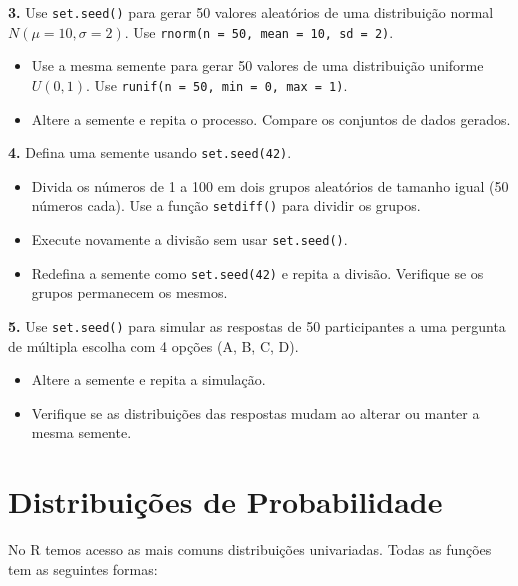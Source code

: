 \documentclass[
]{book}
\providecommand{\tightlist}{%
  \setlength{\itemsep}{0pt}\setlength{\parskip}{0pt}}
\begin{document}
\textbf{3.} Use \texttt{set.seed()} para gerar 50 valores aleatórios de uma distribuição normal \(N(\mu=10, \sigma=2)\). Use \texttt{rnorm(n\ =\ 50,\ mean\ =\ 10,\ sd\ =\ 2)}.

\begin{itemize}
\tightlist
\item
  Use a mesma semente para gerar 50 valores de uma distribuição uniforme \(U(0, 1)\). Use \texttt{runif(n\ =\ 50,\ min\ =\ 0,\ max\ =\ 1)}.
\item
  Altere a semente e repita o processo. Compare os conjuntos de dados gerados.
\end{itemize}

\textbf{4.} Defina uma semente usando \texttt{set.seed(42)}.

\begin{itemize}
\tightlist
\item
  Divida os números de 1 a 100 em dois grupos aleatórios de tamanho igual (50 números cada). Use a função \texttt{setdiff()} para dividir os grupos.
\item
  Execute novamente a divisão sem usar \texttt{set.seed()}.
\item
  Redefina a semente como \texttt{set.seed(42)} e repita a divisão. Verifique se os grupos permanecem os mesmos.
\end{itemize}

\textbf{5.} Use \texttt{set.seed()} para simular as respostas de 50 participantes a uma pergunta de múltipla escolha com 4 opções (A, B, C, D).

\begin{itemize}
\tightlist
\item
  Altere a semente e repita a simulação.
\item
  Verifique se as distribuições das respostas mudam ao alterar ou manter a mesma semente.
\end{itemize}

\chapter{Distribuições de Probabilidade}\label{distribuiuxe7uxf5es-de-probabilidade}

No R temos acesso as mais comuns distribuições univariadas. Todas as
funções tem as seguintes formas:
\end{document}
